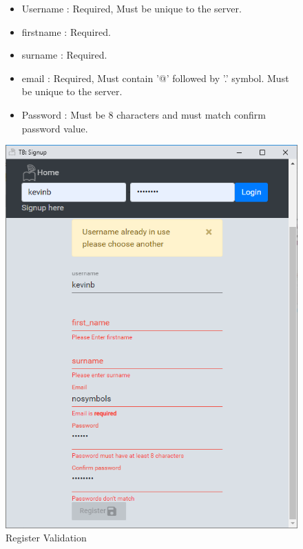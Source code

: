 \begin{figure}[H]
\begin{minipage}{.5\textwidth}  %
\lstset{0.6\textwidth, breaklines=true} %
\begin{itemize}
\item Username : Required, Must be unique to the server.
\item firstname : Required.
\item surname : Required.
\item email : Required, Must contain '@' followed by '.' symbol. Must be unique to the server.
\item Password : Must be 8 characters and must match confirm password value.
\end{itemize}

\end{minipage}
\qquad %
\begin{minipage}{0.4\textwidth} %
\includegraphics[width=.9\linewidth]{img/ui/signuperror.PNG} %
\caption{Register Validation}
\end{minipage}
\end{figure}

